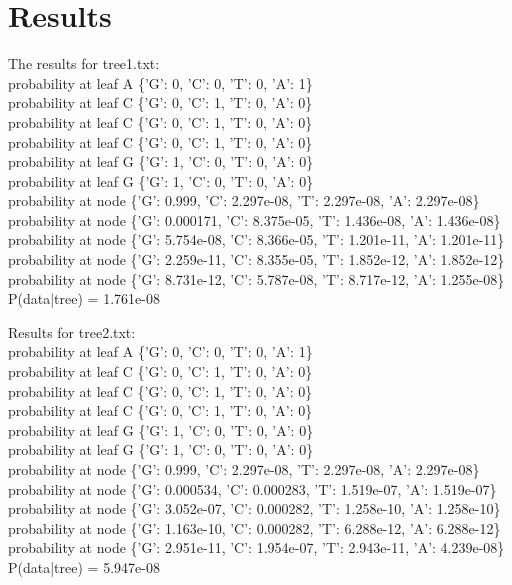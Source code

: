 \documentclass{acm_proc_article-sp}
\begin{document}

\section{Results}
The results for tree1.txt: \\
probability at leaf A \{'G': 0, 'C': 0, 'T': 0, 'A': 1\}\\
probability at leaf C \{'G': 0, 'C': 1, 'T': 0, 'A': 0\}\\
probability at leaf C \{'G': 0, 'C': 1, 'T': 0, 'A': 0\}\\
probability at leaf C \{'G': 0, 'C': 1, 'T': 0, 'A': 0\}\\
probability at leaf G \{'G': 1, 'C': 0, 'T': 0, 'A': 0\}\\
probability at leaf G \{'G': 1, 'C': 0, 'T': 0, 'A': 0\}\\
probability at node \{'G': 0.999, 'C': 2.297e-08, 'T': 2.297e-08, 'A': 2.297e-08\}\\
probability at node \{'G': 0.000171, 'C': 8.375e-05, 'T': 1.436e-08, 'A': 1.436e-08\}\\
probability at node \{'G': 5.754e-08, 'C': 8.366e-05, 'T': 1.201e-11, 'A': 1.201e-11\}\\
probability at node \{'G': 2.259e-11, 'C': 8.355e-05, 'T': 1.852e-12, 'A': 1.852e-12\}\\
probability at node \{'G': 8.731e-12, 'C': 5.787e-08, 'T': 8.717e-12, 'A': 1.255e-08\}\\
P(data|tree) = 1.761e-08

Results for tree2.txt:\\
probability at leaf A \{'G': 0, 'C': 0, 'T': 0, 'A': 1\} \\
probability at leaf C \{'G': 0, 'C': 1, 'T': 0, 'A': 0\}\\
probability at leaf C \{'G': 0, 'C': 1, 'T': 0, 'A': 0\}\\
probability at leaf C \{'G': 0, 'C': 1, 'T': 0, 'A': 0\}\\
probability at leaf G \{'G': 1, 'C': 0, 'T': 0, 'A': 0\}\\
probability at leaf G \{'G': 1, 'C': 0, 'T': 0, 'A': 0\}\\
probability at node \{'G': 0.999, 'C': 2.297e-08, 'T': 2.297e-08, 'A': 2.297e-08\}\\
probability at node \{'G': 0.000534, 'C': 0.000283, 'T': 1.519e-07, 'A': 1.519e-07\}\\
probability at node \{'G': 3.052e-07, 'C': 0.000282, 'T': 1.258e-10, 'A': 1.258e-10\}\\
probability at node \{'G': 1.163e-10, 'C': 0.000282, 'T': 6.288e-12, 'A': 6.288e-12\}\\
probability at node \{'G': 2.951e-11, 'C': 1.954e-07, 'T': 2.943e-11, 'A': 4.239e-08\}\\
P(data|tree) = 5.947e-08
\end{document}
